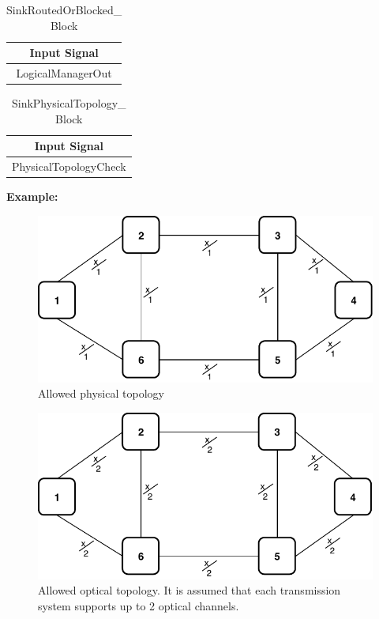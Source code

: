 \begin{table}[H]
	\centering
	\begin{tabular}{| c |}
		\hline
		\textbf{Input Signal}\\ \hline
		LogicalManagerOut \\ \hline
	\end{tabular}
	\caption{SinkRoutedOrBlocked\_ Block}
	\label{sink_routed_or_blocked_block}
\end{table}

\begin{table}[H]
	\centering
	\begin{tabular}{| c |}
		\hline
		\textbf{Input Signal}\\ \hline
		PhysicalTopologyCheck \\ \hline
	\end{tabular}
	\caption{SinkPhysicalTopology\_ Block}
	\label{sink_physical_topology_block}
\end{table}


\newpage
\vspace{11pt}

\textbf{Example:}

\begin{figure}[h!]
	\centering
	\includegraphics[width=13cm]{sdf/heuristic/opaque/figures/allowed_physical_ex}
	\caption{Allowed physical topology}
	\label{allowed_physical_ex}
\end{figure}


\begin{figure}[h!]
	\centering
	\includegraphics[width=13cm]{sdf/heuristic/opaque/figures/allowed_optical_ex}
	\caption{Allowed optical topology. It is assumed that each transmission system supports up to 2 optical channels.}
	\label{allowed_optical_ex}
\end{figure}


